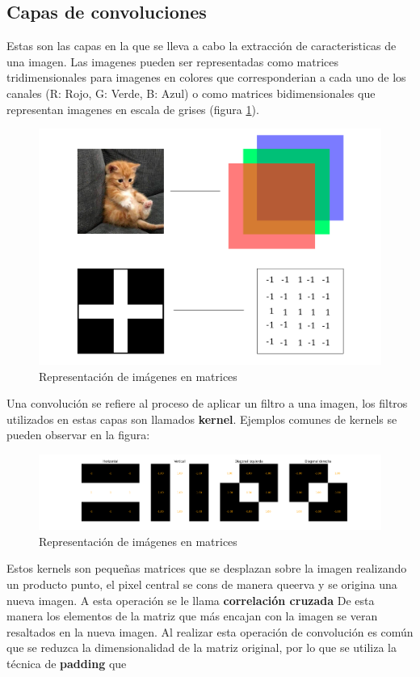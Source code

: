 \documentclass{article}
\begin{document}
\subsection{Capas de convoluciones}
Estas son las capas en la que se lleva a cabo la extracción de caracteristicas de una imagen. 
Las imagenes pueden ser representadas como matrices tridimensionales para imagenes en colores que corresponderian a cada uno de los canales (R: Rojo, G: Verde, B: Azul) o como matrices bidimensionales que representan imagenes en escala de grises (figura \ref{cat}). 
\begin{figure}[H]
    \centering
    \includegraphics[width=115mm]{cat.png}
    \caption{Representación de imágenes en matrices}
    \label{cat}
\end{figure}
Una convolución se refiere al proceso de aplicar un filtro a una imagen, los filtros utilizados en estas capas son llamados \textbf{kernel}. Ejemplos comunes de kernels se pueden observar en la figura: 
\begin{figure}[H]
    \centering 
    \includegraphics[width=170mm]{kernels.png}
    \caption{Representación de imágenes en matrices}
    \label{kernels}
\end{figure}
Estos kernels son pequeñas matrices que se desplazan sobre la imagen realizando un producto punto, el pixel central se cons de manera queerva y se origina una nueva imagen. A esta operación se le llama \textbf{correlación cruzada} De esta manera los elementos de la matriz que más encajan con la imagen se veran resaltados en la nueva imagen. Al realizar esta operación de convolución es común que se reduzca la dimensionalidad de la matriz original, por lo que se utiliza la técnica de \textbf{padding} que 
\end{document}
